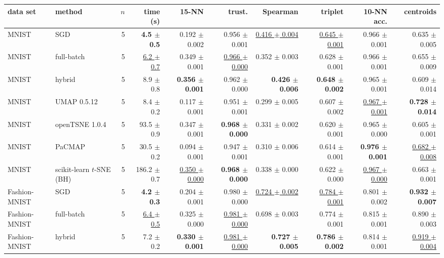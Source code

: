 \begin{tabular}{llrrrrrrrr}
\toprule
data set & method & $n$ & time (s) & 15-NN & trust. & Spearman & triplet & 10-NN acc. & centroids \\
\midrule
MNIST & \magnet{} SGD & 5 & \textbf{4.5 $\pm$ 0.5} & 0.192 $\pm$ 0.002 & 0.956 $\pm$ 0.001 & \underline{0.416 $\pm$ 0.004} & \underline{0.645 $\pm$ 0.001} & 0.966 $\pm$ 0.001 & 0.635 $\pm$ 0.005 \\
MNIST & \magnet{} full-batch & 5 & \underline{6.2 $\pm$ 0.7} & 0.349 $\pm$ 0.001 & \underline{0.966 $\pm$ 0.000} & 0.352 $\pm$ 0.003 & 0.628 $\pm$ 0.001 & 0.966 $\pm$ 0.001 & 0.655 $\pm$ 0.009 \\
MNIST & \magnet{} hybrid & 5 & 8.9 $\pm$ 0.8 & \textbf{0.356 $\pm$ 0.001} & 0.962 $\pm$ 0.000 & \textbf{0.426 $\pm$ 0.006} & \textbf{0.648 $\pm$ 0.002} & 0.965 $\pm$ 0.001 & 0.609 $\pm$ 0.014 \\
MNIST & UMAP 0.5.12 & 5 & 8.4 $\pm$ 0.2 & 0.117 $\pm$ 0.001 & 0.951 $\pm$ 0.001 & 0.299 $\pm$ 0.005 & 0.607 $\pm$ 0.002 & \underline{0.967 $\pm$ 0.001} & \textbf{0.728 $\pm$ 0.014} \\
MNIST & openTSNE 1.0.4 & 5 & 93.5 $\pm$ 0.9 & 0.347 $\pm$ 0.001 & \textbf{0.968 $\pm$ 0.000} & 0.331 $\pm$ 0.002 & 0.620 $\pm$ 0.001 & 0.965 $\pm$ 0.000 & 0.605 $\pm$ 0.001 \\
MNIST & PaCMAP & 5 & 30.5 $\pm$ 0.2 & 0.094 $\pm$ 0.001 & 0.947 $\pm$ 0.001 & 0.310 $\pm$ 0.006 & 0.614 $\pm$ 0.001 & \textbf{0.976 $\pm$ 0.001} & \underline{0.682 $\pm$ 0.008} \\
MNIST & scikit-learn $t$-SNE (BH) & 5 & 186.2 $\pm$ 0.7 & \underline{0.350 $\pm$ 0.000} & \textbf{0.968 $\pm$ 0.000} & 0.338 $\pm$ 0.000 & 0.622 $\pm$ 0.000 & \underline{0.967 $\pm$ 0.000} & 0.663 $\pm$ 0.001 \\
\midrule
Fashion-MNIST & \magnet{} SGD & 5 & \textbf{4.2 $\pm$ 0.3} & 0.204 $\pm$ 0.001 & 0.980 $\pm$ 0.000 & \underline{0.724 $\pm$ 0.002} & \underline{0.784 $\pm$ 0.001} & 0.801 $\pm$ 0.002 & \textbf{0.932 $\pm$ 0.007} \\
Fashion-MNIST & \magnet{} full-batch & 5 & \underline{6.4 $\pm$ 0.5} & 0.325 $\pm$ 0.000 & \underline{0.981 $\pm$ 0.000} & 0.698 $\pm$ 0.003 & 0.774 $\pm$ 0.001 & 0.815 $\pm$ 0.001 & 0.890 $\pm$ 0.003 \\
Fashion-MNIST & \magnet{} hybrid & 5 & 7.2 $\pm$ 0.2 & \textbf{0.330 $\pm$ 0.001} & \underline{0.981 $\pm$ 0.000} & \textbf{0.727 $\pm$ 0.005} & \textbf{0.786 $\pm$ 0.002} & 0.814 $\pm$ 0.001 & \underline{0.919 $\pm$ 0.004} \\

\end{tabular}
